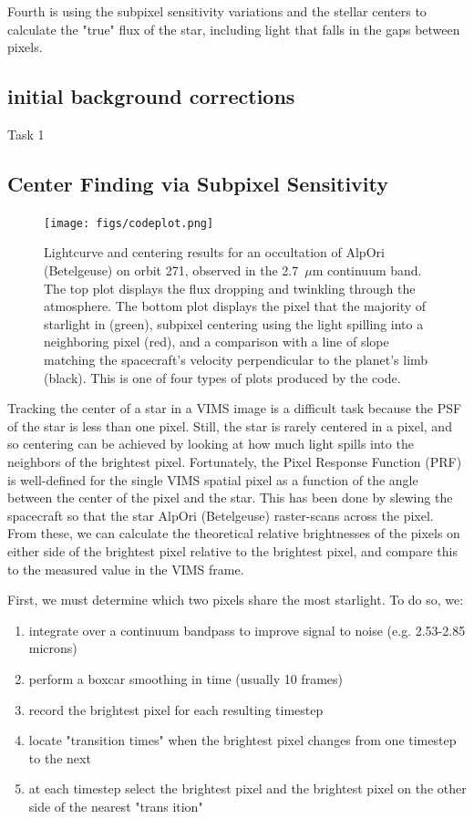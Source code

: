 \documentclass[twocolumn, twocolappendix, numberedappendix, linenumbers]{aastex631}
\begin{document}
Fourth is using the subpixel sensitivity variations and the stellar centers to
calculate the "true" flux of the star, including light that falls in the gaps
between pixels.

\subsection{initial background corrections}
Task 1

\subsection{Center Finding via Subpixel Sensitivity}

\begin{figure}[ht]
  \centering
  \texttt{[image: figs/codeplot.png]}
  \caption{Lightcurve and centering results for an occultation of AlpOri
(Betelgeuse) on orbit 271, observed in the 2.7~$\mu$m continuum band. The top
plot displays the flux dropping and twinkling through the atmosphere. The
bottom plot displays the pixel that the majority of starlight in (green),
subpixel centering using the light spilling into a neighboring pixel (red),
and a comparison with a line of slope matching the spacecraft's velocity perpendicular
to the planet's limb (black).  This is one of four types of plots produced by
the code.}
  \label{fig:codeplots}
\end{figure}

Tracking the center of a star in a VIMS image is a difficult task because the
PSF of the star is less than one pixel. Still, the star is rarely centered in a
pixel, and so centering can be achieved by looking at how much light spills
into the neighbors of the brightest pixel. Fortunately, the Pixel Response
Function (PRF) is well-defined for the single VIMS spatial pixel as a function
of the angle between the center of the pixel and the star. This has been done
by slewing the spacecraft so that the star AlpOri (Betelgeuse) raster-scans
across the pixel. From these, we can calculate the theoretical relative
brightnesses of the pixels on either side of the brightest pixel relative to
the brightest pixel, and compare this to the measured value in the VIMS frame.

First, we must determine which two pixels share the most starlight. To do so,
we:
\begin{enumerate}
  \item integrate over a continuum bandpass to improve signal to noise (e.g. 2.53-2.85 microns)
  \item perform a boxcar smoothing in time (usually 10 frames)
  \item record the brightest pixel for each resulting timestep
  \item locate "transition times" when the brightest pixel changes from one timestep to the next
  \item at each timestep select the brightest pixel and the brightest pixel on the other side of the nearest "trans
ition"
\end{enumerate}
\end{document}
